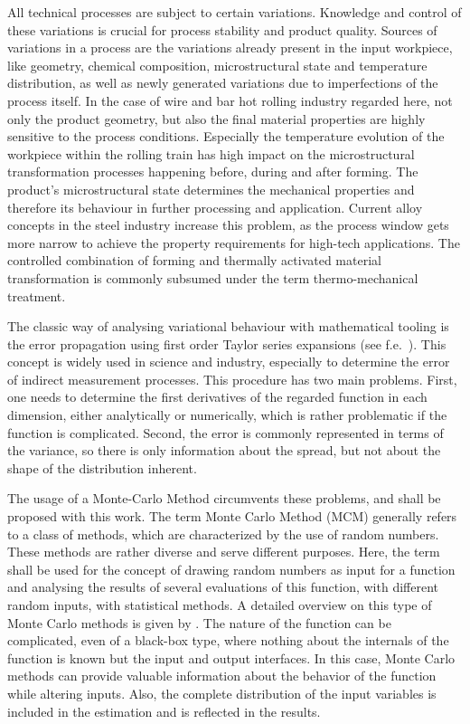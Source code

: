 All technical processes are subject to certain variations.
Knowledge and control of these variations is crucial for process stability and product quality.
Sources of variations in a process are the variations already present in the input workpiece,
like geometry, chemical composition, microstructural state and temperature distribution,
as well as newly generated variations due to imperfections of the process itself.
In the case of wire and bar hot rolling industry regarded here, not only the product geometry, but also the final material properties are highly sensitive to the process conditions.
Especially the temperature evolution of the workpiece within the rolling train has high impact on the microstructural transformation processes happening before, during and after forming.
The product's microstructural state determines the mechanical properties and therefore its behaviour in further processing and application.
Current alloy concepts in the steel industry increase this problem, as the process window gets more narrow to achieve the property requirements for high-tech applications.
The controlled combination of forming and thermally activated material transformation is commonly subsumed under the term thermo-mechanical treatment.

The classic way of analysing variational behaviour with mathematical tooling is the error propagation using first order Taylor series expansions (see f.e.~\cite{Ku1966}).
This concept is widely used in science and industry, especially to determine the error of indirect measurement processes.
This procedure has two main problems.
First, one needs to determine the first derivatives of the regarded function in each dimension, either analytically or numerically, which is rather problematic if the function is complicated.
Second, the error is commonly represented in terms of the variance, so there is only information about the spread, but not about the shape of the distribution inherent.

The usage of a Monte-Carlo Method circumvents these problems, and shall be proposed with this work.
The term Monte Carlo Method (MCM) generally refers to a class of methods, which are characterized by the use of random numbers.
These methods are rather diverse and serve different purposes.
Here, the term shall be used for the concept of drawing random numbers as input for a function and analysing the results of several evaluations of this function, with different random inputs, with statistical methods.
A detailed overview on this type of Monte Carlo methods is given by \textcite{Lemieux2009}.
The nature of the function can be complicated, even of a black-box type, where nothing about the internals of the function is known but the input and output interfaces.
In this case, Monte Carlo methods can provide valuable information about the behavior of the function while altering inputs.
Also, the complete distribution of the input variables is included in the estimation and is reflected in the results.

